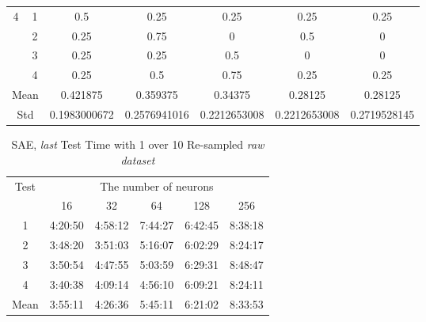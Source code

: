 \documentclass[draft,dvipsnames]{drexel-thesis}
\begin{document}
\begin{thesis}
\begin{table}[!t]
\begin{tabular}{|c|c|c|c|c|c|c|}
\multirow{4}{*}{4}    & 1                   & 0.5          & 0.25         & 0.25         & 0.25         & 0.25         \\ \cline{2-7}
                      & 2                   & 0.25         & 0.75         & 0            & 0.5          & 0            \\ \cline{2-7}
                      & 3                   & 0.25         & 0.25         & 0.5          & 0            & 0            \\ \cline{2-7}
                      & 4                   & 0.25         & 0.5          & 0.75         & 0.25         & 0.25         \\ \hline
\multicolumn{2}{|c|}{Mean}                  & 0.421875     & 0.359375     & 0.34375      & 0.28125      & 0.28125      \\ \hline
\multicolumn{2}{|c|}{Std}                   & 0.1983000672 & 0.2576941016 & 0.2212653008 & 0.2212653008 & 0.2719528145 \\ \hline
\end{tabular}
\end{table}

\begin{table}[!t]
\centering
\caption{SAE, {\em last} Test Time with 1 over 10 Re-sampled {\em raw dataset}}
\label{tbl:sae_last_1_10_time}
\begin{tabular}{|c|c|c|c|c|c|}
\hline
\multirow{2}{*}{Test} & \multicolumn{5}{c|}{The number of neurons}      \\ \cline{2-6}
                      & 16      & 32      & 64      & 128     & 256     \\ \hline
1                     & 4:20:50 & 4:58:12 & 7:44:27 & 6:42:45 & 8:38:18 \\ \hline
2                     & 3:48:20 & 3:51:03 & 5:16:07 & 6:02:29 & 8:24:17 \\ \hline
3                     & 3:50:54 & 4:47:55 & 5:03:59 & 6:29:31 & 8:48:47 \\ \hline
4                     & 3:40:38 & 4:09:14 & 4:56:10 & 6:09:21 & 8:24:11 \\ \hline
Mean                  & 3:55:11 & 4:26:36 & 5:45:11 & 6:21:02 & 8:33:53 \\ \hline
\end{tabular}
\end{table}



\end{thesis}
\end{document}
